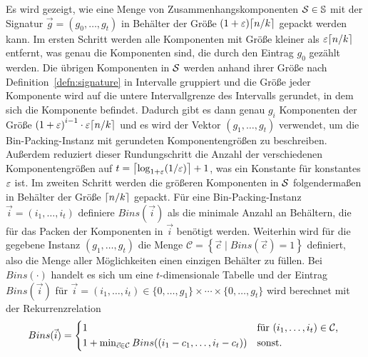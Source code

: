 Es wird gezeigt, wie eine Menge von Zusammenhangskomponenten $\calS \in \bbS$ mit der Signatur $\vec{g} = (g_0, \ldots, g_t)$ in Behälter der Größe $(1 + \eps) \ceil{n/k}$ gepackt werden kann.
Im ersten Schritt werden alle Komponenten mit Größe kleiner als $\eps \ceil*{n/k}$ entfernt, was genau die Komponenten sind, die durch den Eintrag $g_0$ gezählt werden.
Die übrigen Komponenten in $\calS$ werden anhand ihrer Größe nach Definition~\ref{defn:signature} in Intervalle gruppiert und die Größe jeder Komponente wird auf die untere Intervallgrenze des Intervalls gerundet, in dem sich die Komponente befindet.
Dadurch gibt es dann genau $g_i$ Komponenten der Größe ${(1 + \eps)}^{i-1} \cdot \eps \ceil*{n/k}$ und es wird der Vektor $(g_1, \ldots, g_t)$ verwendet, um die Bin-Packing-Instanz mit gerundeten Komponentengrößen zu beschreiben. 
Außerdem reduziert dieser Rundungschritt die Anzahl der verschiedenen Komponentengrößen auf $t = \ceil*{\log_{1+\eps}(1/\eps)} + 1$, was ein Konstante für konstantes $\eps$ ist.
Im zweiten Schritt werden die größeren Komponenten in $\calS$ folgendermaßen in Behälter der Größe $\ceil{n/k}$ gepackt.
Für eine Bin-Packing-Instanz $\vec{i} = (i_1, \ldots, i_t)$ definiere $Bins(\vec{i})$ als die minimale Anzahl an Behältern, die für das Packen der Komponenten in $\vec{i}$ benötigt werden.
Weiterhin wird für die gegebene Instanz $(g_1, \ldots, g_t)$ die Menge $\mathcal{C} = \left\{ \vec{c} \mid Bins(\vec{c}) = 1 \right\}$ definiert, also die Menge aller Möglichkeiten einen einzigen Behälter zu füllen.
Bei $Bins(\cdot)$ handelt es sich um eine $t$-dimensionale Tabelle und der Eintrag $Bins(\vec{i})$ für $\vec{i} = (i_1, \ldots, i_t) \in \{0, \ldots, g_1\} \times \cdots \times \{0, \ldots, g_t\}$ wird berechnet mit der Rekurrenzrelation 
\begin{equation}\label{eq:packing}
    Bins(\vec{i}) = 
    \begin{cases*}
        1 & für $(i_1, \ldots, i_t) \in \mathcal{C}$, \\
        1 + \min_{\vec{c} \in \mathcal{C}} Bins((i_1 - c_1, \ldots, i_t - c_t)) & sonst. \\
    \end{cases*}
\end{equation}

